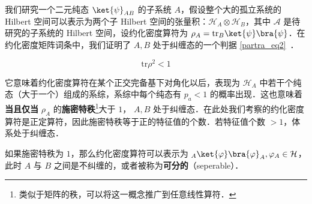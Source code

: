 

我们研究一个二元纯态 $\ket{\psi}_{AB}$ 的子系统 $A$，假设整个大的孤立系统的 Hilbert 空间可以表示为两个子 Hilbert 空间的张量积：$\mathcal{H}_A\otimes \mathcal{H}_B$，其中 $\mathcal A$ 是待研究的子系统的 Hilbert 空间，设约化密度算符为 $\rho_A=\text{tr}_B \ket{\psi}\bra{\psi}$．在约化密度矩阵词条中，我们证明了 $A,B$ 处于纠缠态的一个判据 \autoref{partra_eq2}~．

\begin{equation}
\text{tr} \rho^2 <1
\end{equation}

它意味着约化密度算符在某个正交完备基下对角化以后，表现为 $\mathcal{H}_A$ 中若干个纯态（大于一个）组成的系综，系综中每个纯态有 $p_a<1$ 的概率出现．这也意味着\textbf{当且仅当} $\rho_A$ 的\textbf{施密特秩}\footnote{类似于矩阵的秩，可以将这一概念推广到任意线性算符．}大于 $1$， $A,B$ 处于纠缠态．在此处我们考察的约化密度算符是正定算符，因此施密特秩等于正的特征值的个数．若特征值个数 $>1$，体系处于纠缠态．

如果施密特秩为 $1$，那么约化密度算符可以表示为 ${}_A\ket{\varphi}\bra{\varphi}_A,\varphi_A\in \mathcal{H}$，此时 $A$ 与 $B$ 之间是不纠缠的，或者被称为\textbf{可分的}（seperable）．